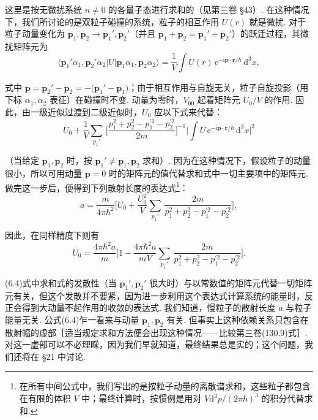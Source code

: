 这里是按无微扰系统 $n\neq0$ 的各量子态进行求和的（见第三卷 §43）. 在这种情况下，我们所讨论的是双粒子碰撞的系统，粒子的相互作用 $U(r)$ 就是微扰. 对于粒子动量变化为 $\bm p_{1},\bm p_{2}\to\bm p_{1}',\bm p_{2}'$（并且 $\bm p_{1}+\bm p_{2}=\bm p_{1}'+\bm p_{2}'$）的跃迁过程，其微扰矩阵元为
\begin{equation}
\langle\bm p_{1}'\alpha_{1},\bm p_{2}'\alpha_{2}|U|\bm p_{1}\alpha_{1},\bm p_{2}\alpha_{2}\rangle
=\frac{1}{V}\int U(r)\,\mathrm{e}^{-\mathrm{i}\bm p\cdot\bm r/\hbar}\,\mathrm{d}^{3}x,
\end{equation}

式中 $\bm p=\bm p_{2}'-\bm p_{2}=-\bigl(\bm p_{1}'-\bm p_{1}\bigr)$；由于相互作用与自旋无关，粒子自旋投影（用下标 $\alpha_{1},\alpha_{2}$ 表征）在碰撞时不变. 动量为零时，$V_{00}$ 起着矩阵元 $U_{0}/V$ 的作用. 因此，由一级近似过渡到二级近似时，$U_{0}$ 应以下式来代替：
\begin{equation*}
U_{0}+\frac{1}{V}\sum_{p_{1}'}\,
\biggl[\frac{p_{1}^{2}+p_{2}^{2}-p_{1}^{\prime2}-p_{2}^{\prime2}}{2m}\biggr]^{-1}
\biggl|\int U\,\mathrm{e}^{-\mathrm{i}\bm p\cdot\bm r/\hbar}\,\mathrm{d}^{3}x\biggr|^{2}
\end{equation*}

（当给定 $\bm p_{1},\bm p_{2}$ 时，按 $\bm p_{1}'\neq\bm p_{1},\bm p_{2}$ 求和）. 因为在这种情况下，假设粒子的动量很小，所以可用动量 $\bm p=0$ 时的矩阵元的值代替求和式中一切主要项中的矩阵元. 做完这一步后，便得到下列散射长度的表达式\footnote{在所有中间公式中，我们写出的是按粒子动量的离散谱求和，这些粒子都包含在有限的体积 $V$ 中；最终计算时，按惯例是用对 $V\mathrm{d}^{3}p/(2\pi\hbar)^{3}$ 的积分代替求和.}：
\begin{equation}
a=\frac{m}{4\pi\hbar^{2}}\biggl[U_{0}+\frac{U_{0}^{2}}{V}\sum_{p_{1}'}\,
\frac{2m}{p_{1}^{2}+p_{2}^{2}-p_{1}^{\prime2}-p_{2}^{\prime2}}\biggr],
\end{equation}

因此，在同样精度下则有
\begin{equation}
U_{0}=\frac{4\pi\hbar^{2}a}{m}\biggl[1-\frac{4\pi\hbar^{2}a}{mV}\sum_{p_{1}'}\,
\frac{2m}{p_{1}^{2}+p_{2}^{2}-p_{1}^{\prime2}-p_{2}^{\prime2}}\biggr].
\end{equation}

(6.4)式中求和式的发散性（当 $\bm p_{1}',\bm p_{2}'$ 很大时）与以常数值的矩阵元代替一切矩阵元有关，但这个发散并不要紧，因为进一步利用这个表达式计算系统的能量时，反正会得到大动量不起作用的收敛的表达式. 我们知道，慢粒子的散射长度 $a$ 与粒子能量无关. 公式(6.4)乍一看来与动量 $\bm p_{1},\bm p_{2}$ 有关. 但事实上这种依赖关系只包含在散射幅的虚部［适当规定求和方法便会出现这种情况——比较第三卷(130.9)式］. 对这一虚部可以不必理睬，因为我们早就知道，最终结果总是实的；这个问题，我们还将在 §21 中讨论.

